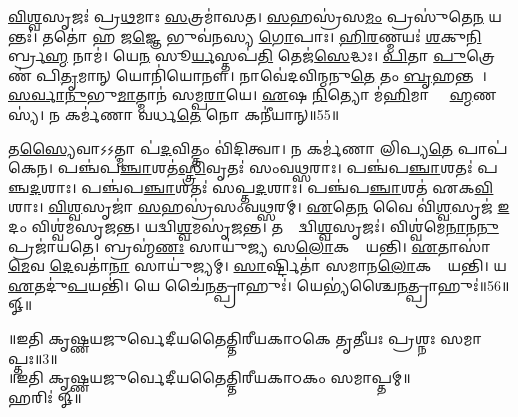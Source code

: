    \ul{𑌵𑌿}\ul{𑌶𑍍𑌵}𑌸𑍃𑌜𑌃॑ 𑌪𑍍𑌰\ul{𑌥}𑌮𑌾𑌃 \ul{𑌸}𑌤𑍍𑌰𑌮𑌾॑𑌸𑌤।
   \ul{𑌸}𑌹𑌸𑍍𑌰॑𑌸\ul{𑌮𑌂} 𑌪𑍍𑌰𑌸𑍁॑𑌤𑍇\ul{𑌨} 𑌯𑌨𑍍𑌤𑌃॑।
   𑌤𑌤𑍋॑ 𑌹 𑌜\ul{𑌜𑍍𑌞𑍇} 𑌭𑍁𑌵॑𑌨𑌸𑍍𑌯 \ul{𑌗𑍋}𑌪𑌾𑌃।
   \ul{𑌹𑌿}\ul{𑌰}𑌣𑍍𑌮𑌯𑌃॑ \ul{𑌶}𑌕𑍁\ul{𑌨𑌿}𑌰𑍍𑌬𑍍𑌰\ul{𑌹𑍍𑌮} 𑌨𑌾𑌮॑।
   𑌯𑍇\ul{𑌨} 𑌸𑍂\ul{𑌰𑍍𑌯}𑌸𑍍𑌤𑌪॑\ul{𑌤𑌿} 𑌤𑍇𑌜॑\ul{𑌸𑍇}𑌦𑍍𑌧𑌃।
   \ul{𑌪𑌿}𑌤𑌾 \ul{𑌪𑍁}𑌤𑍍𑌰𑍇𑌣॑ 𑌪𑌿\ul{𑌤𑍃}𑌮𑌾𑌨𑍍 𑌯𑍋𑌨𑌿॑𑌯𑍋𑌨𑍗।
   𑌨𑌾𑌵𑍇॑𑌦𑌵𑌿𑌨𑍍𑌮𑌨𑍁\ul{𑌤𑍇} 𑌤𑌂 \ul{𑌬𑍃}𑌹𑌨𑍍𑌤𑌮𑍍᳚।
   \ul{𑌸}\ul{𑌰𑍍𑌵𑌾}\ul{𑌨𑍁}𑌭𑍁\ul{𑌮𑌾}𑌤𑍍𑌮𑌾𑌨॑ 𑌸𑌮𑍍𑌪\ul{𑌰𑌾}𑌯𑍇।
   \ul{𑌏}𑌷 \ul{𑌨𑌿}𑌤𑍍𑌯𑍋 𑌮॑\ul{𑌹𑌿}𑌮𑌾 𑌬𑍍𑌰𑌾᳚\ul{𑌹𑍍𑌮}𑌣𑌸𑍍𑌯॑।
   𑌨 𑌕𑌰𑍍𑌮॑𑌣𑌾 𑌵𑌰𑍍𑌧\ul{𑌤𑍇} 𑌨𑍋 𑌕𑌨𑍀॑𑌯𑌾𑌨𑍍॥55॥

   𑌤\ul{𑌸𑍍𑌯𑍈}𑌵𑌾𑌽𑌽𑌤𑍍𑌮𑌾 𑌪॑\ul{𑌦}𑌵𑌿𑌤𑍍𑌤𑌂 𑌵𑌿॑𑌦𑌿𑌤𑍍𑌵𑌾।
   𑌨 𑌕𑌰𑍍𑌮॑𑌣𑌾 𑌲𑌿𑌪𑍍𑌯\ul{𑌤𑍇} 𑌪𑌾𑌪॑𑌕𑍇𑌨।
   𑌪𑌞𑍍𑌚॑𑌪\ul{𑌞𑍍𑌚𑌾}𑌶𑌤॑\ul{𑌸𑍍𑌤𑍍𑌰𑌿}𑌵𑍃𑌤𑌃॑ 𑌸𑌂𑌵\ul{𑌥𑍍𑌸}𑌰𑌾𑌃।
   𑌪𑌞𑍍𑌚॑𑌪\ul{𑌞𑍍𑌚𑌾}𑌶𑌤𑌃॑ 𑌪𑌞𑍍𑌚\ul{𑌦}𑌶𑌾𑌃।
   𑌪𑌞𑍍𑌚॑𑌪\ul{𑌞𑍍𑌚𑌾}𑌶𑌤𑌃॑ 𑌸𑌪𑍍𑌤\ul{𑌦}𑌶𑌾𑌃।
   𑌪𑌞𑍍𑌚॑𑌪\ul{𑌞𑍍𑌚𑌾}𑌶𑌤॑ 𑌏𑌕\ul{𑌵𑌿}\ul{}𑌶𑌾𑌃।
   \ul{𑌵𑌿}\ul{𑌶𑍍𑌵}𑌸𑍃𑌜𑌾॑ \ul{𑌸}𑌹𑌸𑍍𑌰॑𑌸𑌂𑌵𑌥𑍍𑌸𑌰𑌮𑍍।
   \ul{𑌏}𑌤𑍇\ul{𑌨} 𑌵𑍈 𑌵𑌿॑\ul{𑌶𑍍𑌵}𑌸𑍃𑌜॑ \ul{𑌇}𑌦𑌂 𑌵𑌿𑌶𑍍𑌵॑𑌮𑌸𑍃𑌜𑌨𑍍𑌤।
   𑌯𑌦𑍍𑌵𑌿\ul{𑌶𑍍𑌵}𑌮𑌸𑍃॑𑌜𑌨𑍍𑌤।
   𑌤𑌸𑍍𑌮𑌾᳚𑌦𑍍𑌵𑌿\ul{𑌶𑍍𑌵}𑌸𑍃𑌜𑌃॑।
   𑌵𑌿𑌶𑍍𑌵॑𑌮𑍇\ul{𑌨𑌾}𑌨\ul{𑌨𑍁} 𑌪𑍍𑌰𑌜𑌾॑𑌯𑌤𑍇।
   𑌬𑍍𑌰𑌹𑍍𑌮॑\ul{𑌣𑌃} 𑌸𑌾𑌯𑍁॑𑌜𑍍𑌯 𑌸\ul{𑌲𑍋}𑌕𑌤𑌾𑌂᳚ 𑌯𑌨𑍍𑌤𑌿।
   \ul{𑌏}𑌤𑌾𑌸𑌾॑\ul{𑌮𑍇}𑌵 \ul{𑌦𑍇}𑌵𑌤𑌾॑\ul{𑌨𑌾}\ul{} 𑌸𑌾𑌯𑍁॑𑌜𑍍𑌯𑌮𑍍।
   \ul{𑌸𑌾}𑌰𑍍𑌷𑍍𑌟𑌿𑌤𑌾॑ 𑌸𑌮𑌾𑌨\ul{𑌲𑍋}𑌕𑌤𑌾𑌂᳚ 𑌯𑌨𑍍𑌤𑌿।
   𑌯 \ul{𑌏}𑌤𑌦𑍁॑\ul{𑌪}𑌯𑌨𑍍𑌤𑌿॑।
   𑌯𑍇 𑌚𑍈॑\ul{𑌨}𑌤𑍍𑌪𑍍𑌰𑌾𑌹𑍁𑌃॑।
   𑌯𑍇𑌭𑍍𑌯॑𑌶𑍍𑌚𑍈\ul{𑌨}𑌤𑍍𑌪𑍍𑌰𑌾𑌹𑍁𑌃॑॥56॥
 𑍐॥
   \anuvakamend

      \begin{center}
॥𑌇𑌤𑌿 𑌕𑍃𑌷𑍍𑌣𑌯𑌜𑍁𑌰𑍍𑌵𑍇𑌦𑍀𑌯𑌤𑍈𑌤𑍍𑌤𑌿𑌰𑍀𑌯𑌕𑌾𑌠𑌕𑍇 𑌤𑍃𑌤𑍀𑌯𑌃 𑌪𑍍𑌰𑌶𑍍𑌨𑌃 𑌸𑌮𑌾𑌪𑍍𑌤𑌃॥3॥\\
॥𑌇𑌤𑌿 𑌕𑍃𑌷𑍍𑌣𑌯𑌜𑍁𑌰𑍍𑌵𑍇𑌦𑍀𑌯𑌤𑍈𑌤𑍍𑌤𑌿𑌰𑍀𑌯𑌕𑌾𑌠𑌕𑌂 𑌸𑌮𑌾𑌪𑍍𑌤𑌮𑍍॥\\
   𑌹𑌰𑌿𑌃॑  𑍐॥
\end{center}
